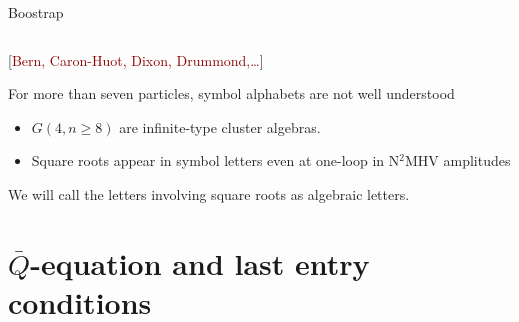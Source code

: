 \documentclass[10pt]{beamer}
\begin{document}
\begin{frame}[t]{Boostrap}
\begin{columns}
\end{columns} 
 
{\footnotesize  [\textcolor{darkred}{Bern, Caron-Huot, Dixon, Drummond,\ldots}]}

For more than seven particles, symbol alphabets are not well understood
\begin{itemize}
  \item  $G(4,n\geq 8)$ are \alert{infinite-type} cluster algebras.
  \item \alert{Square roots} appear in symbol letters even at one-loop in N$^{2}$MHV amplitudes
\end{itemize}
We will call the letters involving square roots as \alert{algebraic letters}.
\end{frame}


\section{$\bar{Q}$-equation and last entry conditions}
\end{document}
